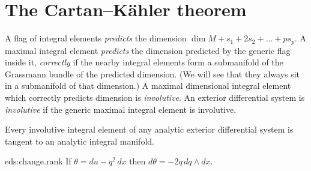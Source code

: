 \section{\texorpdfstring{The Cartan--K\"ahler theorem}{The Cartan--Kaehler theorem}}
A flag of integral elements \emph{predicts} the dimension \(\dim M + s_1+2s_2+\dots+ps_p\).
A maximal integral element \emph{predicts} the dimension predicted by the generic flag inside it, \emph{correctly} if
the nearby integral elements form a submanifold of the Grassmann bundle of the predicted dimension.
(We will see that they always sit in a submanifold of that dimension.)
A maximal dimensional integral element which correctly predicts dimension is \emph{involutive}.
An exterior differential system is \emph{involutive} if the generic maximal integral element is involutive.
\begin{theorem}\label{theorem:CK}
Every involutive integral element of any analytic exterior differential system is tangent to an analytic integral manifold.
\end{theorem}
\begin{answer}{eds:change.rank}
If \(\theta=du-q^2 \, dx\) then \(d\theta = - 2q \, dq \wedge dx\).
\end{answer}

